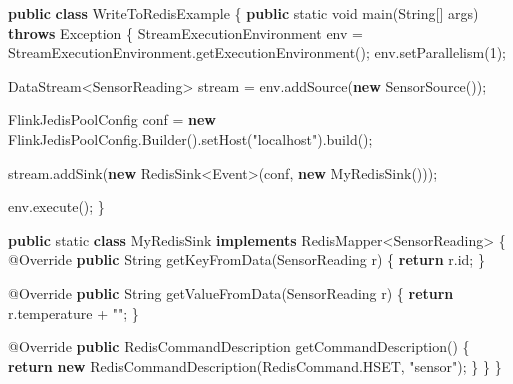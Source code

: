 \documentclass[cn,11pt,chinese]{elegantbook}
\newenvironment{Shaded}{}{}
\newcommand{\AttributeTok}[1]{\textcolor[rgb]{0.49,0.56,0.16}{#1}}
\newcommand{\BuiltInTok}[1]{#1}
\newcommand{\DataTypeTok}[1]{\textcolor[rgb]{0.56,0.13,0.00}{#1}}
\newcommand{\DecValTok}[1]{\textcolor[rgb]{0.25,0.63,0.44}{#1}}
\newcommand{\FunctionTok}[1]{\textcolor[rgb]{0.02,0.16,0.49}{#1}}
\newcommand{\KeywordTok}[1]{\textcolor[rgb]{0.00,0.44,0.13}{\textbf{#1}}}
\newcommand{\NormalTok}[1]{#1}
\newcommand{\StringTok}[1]{\textcolor[rgb]{0.25,0.44,0.63}{#1}}
\begin{document}
\begin{Shaded}
\begin{Highlighting}[]
\KeywordTok{public} \KeywordTok{class}\NormalTok{ WriteToRedisExample \{}
    \KeywordTok{public} \DataTypeTok{static} \DataTypeTok{void} \FunctionTok{main}\NormalTok{(}\BuiltInTok{String}\NormalTok{[] args) }\KeywordTok{throws} \BuiltInTok{Exception}\NormalTok{ \{}
\NormalTok{        StreamExecutionEnvironment env = StreamExecutionEnvironment.}\FunctionTok{getExecutionEnvironment}\NormalTok{();}
\NormalTok{        env.}\FunctionTok{setParallelism}\NormalTok{(}\DecValTok{1}\NormalTok{);}

\NormalTok{        DataStream\textless{}SensorReading\textgreater{} stream = env.}\FunctionTok{addSource}\NormalTok{(}\KeywordTok{new} \FunctionTok{SensorSource}\NormalTok{());}

\NormalTok{        FlinkJedisPoolConfig conf = }\KeywordTok{new}\NormalTok{ FlinkJedisPoolConfig.}\FunctionTok{Builder}\NormalTok{().}\FunctionTok{setHost}\NormalTok{(}\StringTok{"localhost"}\NormalTok{).}\FunctionTok{build}\NormalTok{();}

\NormalTok{        stream.}\FunctionTok{addSink}\NormalTok{(}\KeywordTok{new}\NormalTok{ RedisSink\textless{}}\BuiltInTok{Event}\NormalTok{\textgreater{}(conf, }\KeywordTok{new} \FunctionTok{MyRedisSink}\NormalTok{()));}

\NormalTok{        env.}\FunctionTok{execute}\NormalTok{();}
\NormalTok{    \}}

    \KeywordTok{public} \DataTypeTok{static} \KeywordTok{class}\NormalTok{ MyRedisSink }\KeywordTok{implements}\NormalTok{ RedisMapper\textless{}SensorReading\textgreater{} \{}
        \AttributeTok{@Override}
        \KeywordTok{public} \BuiltInTok{String} \FunctionTok{getKeyFromData}\NormalTok{(SensorReading r) \{}
            \KeywordTok{return}\NormalTok{ r.}\FunctionTok{id}\NormalTok{;}
\NormalTok{        \}}

        \AttributeTok{@Override}
        \KeywordTok{public} \BuiltInTok{String} \FunctionTok{getValueFromData}\NormalTok{(SensorReading r) \{}
            \KeywordTok{return}\NormalTok{ r.}\FunctionTok{temperature}\NormalTok{ + }\StringTok{""}\NormalTok{;}
\NormalTok{        \}}

        \AttributeTok{@Override}
        \KeywordTok{public}\NormalTok{ RedisCommandDescription }\FunctionTok{getCommandDescription}\NormalTok{() \{}
            \KeywordTok{return} \KeywordTok{new} \FunctionTok{RedisCommandDescription}\NormalTok{(RedisCommand.}\FunctionTok{HSET}\NormalTok{, }\StringTok{"sensor"}\NormalTok{);}
\NormalTok{        \}}
\NormalTok{    \}}
\NormalTok{\}}
\end{Highlighting}
\end{Shaded}
\end{document}
